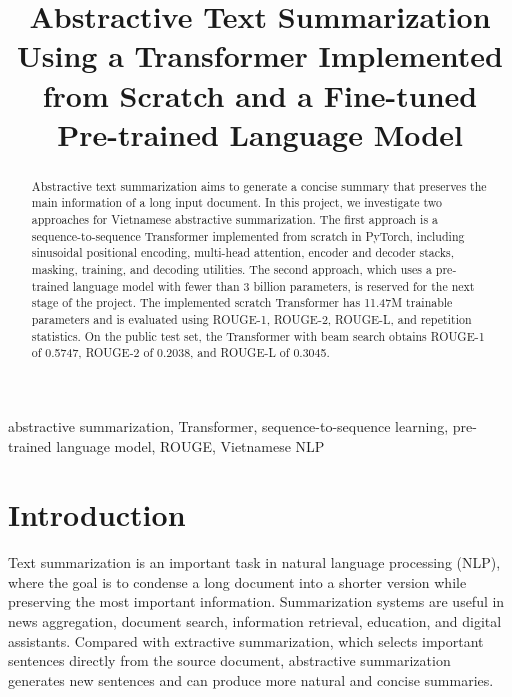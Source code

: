 \documentclass[conference]{IEEEtran}
\begin{document}
\title{Abstractive Text Summarization Using a Transformer Implemented from Scratch and a Fine-tuned Pre-trained Language Model}

\author{
}

\maketitle

\begin{abstract}
Abstractive text summarization aims to generate a concise summary that preserves the main information of a long input document. In this project, we investigate two approaches for Vietnamese abstractive summarization. The first approach is a sequence-to-sequence Transformer implemented from scratch in PyTorch, including sinusoidal positional encoding, multi-head attention, encoder and decoder stacks, masking, training, and decoding utilities. The second approach, which uses a pre-trained language model with fewer than 3 billion parameters, is reserved for the next stage of the project. The implemented scratch Transformer has 11.47M trainable parameters and is evaluated using ROUGE-1, ROUGE-2, ROUGE-L, and repetition statistics. On the public test set, the Transformer with beam search obtains ROUGE-1 of 0.5747, ROUGE-2 of 0.2038, and ROUGE-L of 0.3045.
\end{abstract}

\begin{IEEEkeywords}
abstractive summarization, Transformer, sequence-to-sequence learning, pre-trained language model, ROUGE, Vietnamese NLP
\end{IEEEkeywords}

\section{Introduction}
Text summarization is an important task in natural language processing (NLP), where the goal is to condense a long document into a shorter version while preserving the most important information. Summarization systems are useful in news aggregation, document search, information retrieval, education, and digital assistants. Compared with extractive summarization, which selects important sentences directly from the source document, abstractive summarization generates new sentences and can produce more natural and concise summaries.
\end{document}
